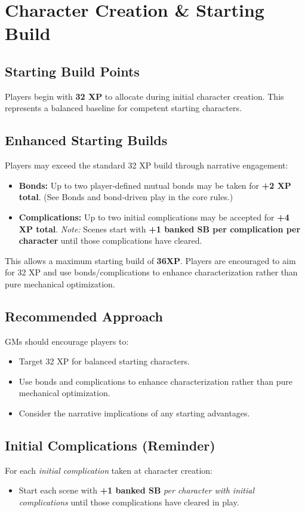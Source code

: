 \section{Character Creation \& Starting Build}

\subsection{Starting Build Points}
Players begin with \textbf{32 XP} to allocate during initial character creation. This represents a balanced baseline for competent starting characters.

\subsection{Enhanced Starting Builds}
Players may exceed the standard 32 XP build through narrative engagement:
\begin{itemize}
  \item \textbf{Bonds:} Up to two player‑defined mutual bonds may be taken for \textbf{+2 XP total}. (See Bonds and bond‑driven play in the core rules.)
  \item \textbf{Complications:} Up to two initial complications may be accepted for \textbf{+4 XP total}. \emph{Note:} Scenes start with \textbf{+1 banked SB per complication per character} until those complications have cleared.
\end{itemize}
This allows a maximum starting build of \textbf{36XP}. Players are encouraged to aim for 32 XP and use bonds/complications to enhance characterization rather than pure mechanical optimization.

\subsection{Recommended Approach}
GMs should encourage players to:
\begin{itemize}
  \item Target 32 XP for balanced starting characters.
  \item Use bonds and complications to enhance characterization rather than pure mechanical optimization.
  \item Consider the narrative implications of any starting advantages.
\end{itemize}

\subsection{Initial Complications (Reminder)}
For each \emph{initial complication} taken at character creation:
\begin{itemize}
  \item Start each scene with \textbf{+1 banked SB} \emph{per character with initial complications} until those complications have cleared in play.
\end{itemize}

